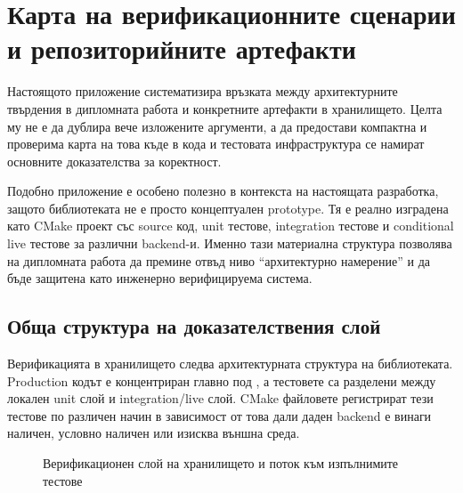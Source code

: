 \section{Карта на верификационните сценарии и репозиторийните артефакти}
\label{sec:verification_appendix}

Настоящото приложение систематизира връзката между архитектурните твърдения в дипломната работа и конкретните артефакти в хранилището. Целта му не е да дублира вече изложените аргументи, а да предостави компактна и проверима карта на това къде в кода и тестовата инфраструктура се намират основните доказателства за коректност.

Подобно приложение е особено полезно в контекста на настоящата разработка, защото библиотеката не е просто концептуален prototype. Тя е реално изградена като CMake проект със source код, unit тестове, integration тестове и conditional live тестове за различни backend-и. Именно тази материална структура позволява на дипломната работа да премине отвъд ниво ``архитектурно намерение'' и да бъде защитена като инженерно верифицируема система.

\subsection{Обща структура на доказателствения слой}

Верификацията в хранилището следва архитектурната структура на библиотеката. Production кодът е концентриран главно под , а тестовете са разделени между локален unit слой и integration/live слой. CMake файловете регистрират тези тестове по различен начин в зависимост от това дали даден backend е винаги наличен, условно наличен или изисква външна среда.

\begin{figure}[H]
\centering
{}
\caption{Верификационен слой на хранилището и поток към изпълнимите тестове}
\label{fig:verification_appendix_map}
\end{figure}

